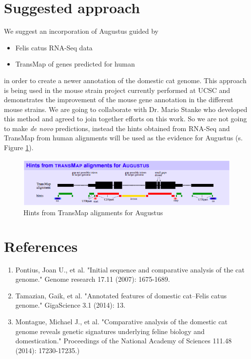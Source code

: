 \documentclass{article}
\begin{document}
\section{Suggested approach}
We suggest an incorporation of Augustus guided by 
\begin{itemize}
\item Felis catus RNA-Seq data 
\item TransMap of genes predicted for human 
\end{itemize}
in order to create a newer annotation of the domestic cat genome. This approach is being used in the mouse strain project currently performed at UCSC and demonstrates the improvement of the mouse gene annotation in the different mouse strains. We are going to collaborate with Dr. Mario Stanke who developed this method and agreed to join together efforts on this work.
So we are not going to make \textit{de novo} predictions, instead the hints obtained from RNA-Seq and TransMap from human alignments will be used as the evidence for Augustus (s. Figure \ref{fig:hints_for_augustus}). 

\begin{figure}[h]
\centering
\includegraphics[width=\textwidth]{images/hints_from_transmap_to_augustus.png}
\caption{Hints from TransMap alignments for Augustus}
\label{fig:hints_for_augustus}
\end{figure}


\section{References}

\begin{enumerate}
\item Pontius, Joan U., et al. "Initial sequence and comparative analysis of the cat genome." Genome research 17.11 (2007): 1675-1689.
\item Tamazian, Gaik, et al. "Annotated features of domestic cat–Felis catus genome." GigaScience 3.1 (2014): 13.
\item Montague, Michael J., et al. "Comparative analysis of the domestic cat genome reveals genetic signatures underlying feline biology and domestication." Proceedings of the National Academy of Sciences 111.48 (2014): 17230-17235.)
\end{enumerate}
\end{document}
